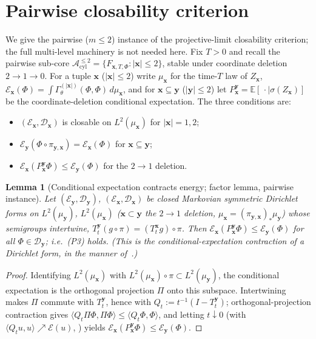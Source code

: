 \documentclass[reqno,final,11pt]{amsart}
\theoremstyle{plain}
\newtheorem{lemma}[theorem]{Lemma}
\theoremstyle{definition}
\theoremstyle{remark}
\newcommand{\E}{\mathbb E}
\newcommand{\cA}{\mathcal A}
\newcommand{\cD}{\mathcal D}
\newcommand{\cE}{\mathcal E}
\newcommand{\Apair}{\cA^{\le 2}_{\mathrm{cyl}}}
\begin{document}
\section{Pairwise closability criterion}\label{app:pairclos}

We give the pairwise ($m\le2$) instance of the projective-limit closability
criterion; the full multi-level machinery is not needed here. Fix
$T>0$ and recall the pairwise sub-core
$\Apair=\{F_{\mathbf x,T,\Phi}:|\mathbf x|\le2\}$, stable under coordinate
deletion $2\to1\to0$. For a tuple $\mathbf x$ ($|\mathbf x|\le2$) write
$\mu_{\mathbf x}$ for the time-$T$ law of $Z_{\mathbf x}$,
$\cE_{\mathbf x}(\Phi)=\int\Gamma^{(|\mathbf x|)}_\theta(\Phi,\Phi)\,d\mu_{\mathbf x}$,
and for $\mathbf x\subseteq\mathbf y$ ($|\mathbf y|\le2$) let
$P^{\mathbf y}_{\mathbf x}=\E[\,\cdot\mid\sigma(Z_{\mathbf x})]$ be the
coordinate-deletion conditional expectation. The three conditions are:
\begin{itemize}
\item[\textnormal{(P1)}] $(\cE_{\mathbf x},\cD_{\mathbf x})$ is closable on
$L^2(\mu_{\mathbf x})$ for $|\mathbf x|=1,2$;
\item[\textnormal{(P2)}] $\cE_{\mathbf y}(\Phi\circ\pi_{\mathbf y,\mathbf x})
=\cE_{\mathbf x}(\Phi)$ for $\mathbf x\subseteq\mathbf y$;
\item[\textnormal{(P3)}] $\cE_{\mathbf x}(P^{\mathbf y}_{\mathbf x}\Phi)
\le\cE_{\mathbf y}(\Phi)$ for the $2\to1$ deletion.
\end{itemize}

\begin{lemma}[Conditional expectation contracts energy; factor lemma, pairwise instance]\label{lem:foldfactor}
Let $(\cE_{\mathbf y},\cD_{\mathbf y})$, $(\cE_{\mathbf x},\cD_{\mathbf x})$ be
closed Markovian symmetric Dirichlet forms on $L^2(\mu_{\mathbf y})$,
$L^2(\mu_{\mathbf x})$ ($\mathbf x\subset\mathbf y$ the $2\to1$ deletion,
$\mu_{\mathbf x}=(\pi_{\mathbf y,\mathbf x})_*\mu_{\mathbf y}$) whose semigroups
intertwine, $T^{\mathbf y}_t(g\circ\pi)=(T^{\mathbf x}_t g)\circ\pi$. Then
$\cE_{\mathbf x}(P^{\mathbf y}_{\mathbf x}\Phi)\le\cE_{\mathbf y}(\Phi)$ for all
$\Phi\in\cD_{\mathbf y}$; i.e.\ \textnormal{(P3)} holds. (This is the
conditional-expectation contraction of a Dirichlet form, in the manner
of~\citep[Thm.~1.6.1]{FOT}.)
\end{lemma}
\begin{proof}
Identifying $L^2(\mu_{\mathbf x})$ with $L^2(\mu_{\mathbf x})\circ\pi\subset
L^2(\mu_{\mathbf y})$, the conditional expectation is the orthogonal projection
$\Pi$ onto this subspace. Intertwining makes $\Pi$ commute with $T^{\mathbf y}_t$,
hence with $Q_t:=t^{-1}(I-T^{\mathbf y}_t)$; orthogonal-projection contraction
gives $\langle Q_t\Pi\Phi,\Pi\Phi\rangle\le\langle Q_t\Phi,\Phi\rangle$, and
letting $t\downarrow0$ (with $\langle Q_t u,u\rangle\nearrow\cE(u)$,
\citep[Lem.~1.3.4]{FOT}) yields $\cE_{\mathbf x}(P^{\mathbf y}_{\mathbf x}\Phi)
\le\cE_{\mathbf y}(\Phi)$.
\end{proof}
\end{document}
